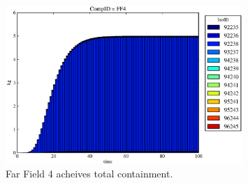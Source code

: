 \begin{frame}[ctb!]
\begin{figure}
\begin{minipage}[b]{0.45\linewidth}
  \includegraphics[width=0.8\textwidth]{./images/mcIII0.eps}
  \caption[Case MCI WP Contaminants.]{ 
    Far Field 4 acheives total containment.
    }
  \label{fig:mcII}


  \end{minipage}
\end{figure}

\end{frame}
